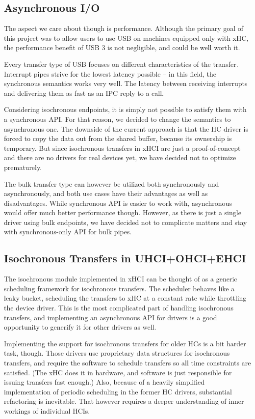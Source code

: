 \subsection{Asynchronous I/O}

The aspect we care about though is performance. Although the primary goal of
this project was to allow users to use USB on machines equipped only with xHC,
the performance benefit of USB 3 is not negligible, and could be well worth it.

Every transfer type of USB focuses on different characteristics of the
transfer. Interrupt pipes strive for the lowest latency possible -- in this
field, the synchronous semantics works very well. The latency between receiving
interrupts and delivering them as fast as an IPC reply to a call.

Considering isochronous endpoints, it is simply not possible to satisfy them
with a synchronous API. For that reason, we decided to change the semantics to asynchronous
one. The downside of the current approach is that the HC driver is forced to
copy the data out from the shared buffer, because its ownership is temporary.
But since isochronous transfers in xHCI are just a proof-of-concept and
there are no drivers for real devices yet, we have decided not to optimize
prematurely.

The bulk transfer type can however be utilized both synchronously and
asynchronously, and both use cases have their advantages as well as disadvantages. While synchronous API is easier to
work with, asynchronous would offer much better performance though. However, as there is just
a single driver using bulk endpoints, we have decided not to complicate matters and stay
with synchronous-only API for bulk pipes.

\subsection{Isochronous Transfers in UHCI+OHCI+EHCI}

The isochronous module implemented in xHCI can be thought of as a generic scheduling
framework for isochronous transfers. The scheduler behaves like a leaky bucket,
scheduling the transfers to xHC at a constant rate while throttling the device
driver. This is the most complicated part of handling isochronous transfers,
and implementing an asynchronous API for drivers is a good opportunity to
generify it for other drivers as well.

Implementing the support for isochronous transfers for older HCs is a bit
harder task, though. Those drivers use proprietary data structures for isochronous
transfers, and require the software to schedule transfers so all time
constraints are satisfied. (The xHC does it in hardware, and software is just
responsible for issuing transfers fast enough.) Also, because of a heavily
simplified implementation of periodic scheduling in the former HC drivers,
substantial refactoring is inevitable. That however requires a deeper
understanding of inner workings of individual HCIs.

